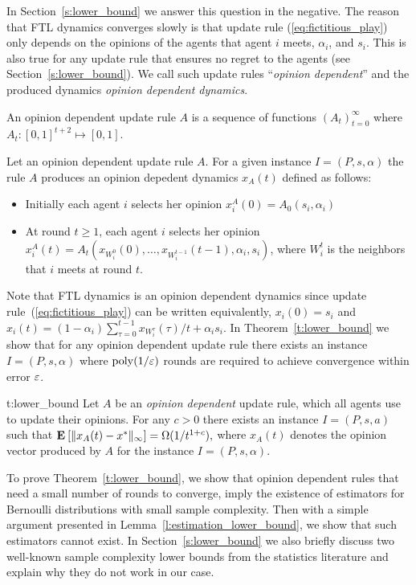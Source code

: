 In Section~\ref{s:lower_bound} we answer this question in the negative.
The reason that FTL dynamics converges slowly is that
update rule (\ref{eq:fictitious_play})
only depends on the opinions of the agents that agent $i$ meets,
$\alpha_i$, and $s_i$. This is also true for any update rule that
ensures no regret to the agents (see Section~\ref{s:lower_bound}).
We call such update rules \enquote{\emph{opinion dependent}}
and the produced dynamics \emph{opinion dependent dynamics}.

\begin{definition}\label{d:opinion_dependent_dynamics}
An opinion dependent update rule $A$ is a sequence of
functions $(A_t)_{t=0}^\infty$ where
$A_t: [0,1]^{t+2}\mapsto [0,1]$.
\end{definition}

\begin{definition}\label{d:opinion_dependent_dynamics}
Let an opinion dependent update rule $A$. For a given instance $I=(P,s,\alpha)$
the rule $A$ produces an opinion depedent dynamics $x_A(t)$ defined as follows:
\begin{itemize}
 \item Initially each agent $i$ selects her opinion $x_i^A(0)=A_0(s_i,\alpha_i)$
 \item At round $t\geq 1$, each agent $i$ selects her opinion
   \(x_i^A(t)=A_t(x_{W_i^0}(0),\dots,x_{W_i^{t-1}}(t-1),\alpha_i,s_i)\),
where $W_i^t$ is the neighbors that $i$ meets at round $t$.
\end{itemize}
\end{definition}

Note that FTL dynamics is an opinion dependent dynamics
since update rule~(\ref{eq:fictitious_play}) can
be written equivalently, $x_i(0)=s_i$ and $x_i(t)=(1-\alpha_i)\sum_{\tau=0}^{t-1}x_{W_i^\tau}(\tau)/t + \alpha_i s_i$.
In Theorem~\ref{t:lower_bound} we
show that for any opinion dependent update rule there exists an instance
$I = (P,s,\alpha)$ where $\mathrm{poly}(1/\varepsilon)$ rounds are required to
achieve convergence within error $\varepsilon$.
\begin{reptheorem}{t:lower_bound}
  Let $A$ be an \emph{opinion dependent} update rule, which all
  agents use to update their opinions.
  For any $c>0$ there exists an instance $I=(P,s,a)$ such that
  \(
    \Exp{\norm{\infty}{x_A(t) - x^*}} = \Omega(1/t^{1+c}),
  \)
  where $x_A(t)$ denotes the opinion vector produced by $A$
  for the instance $I=(P,s,\alpha)$.
\end{reptheorem}
%
To prove Theorem~\ref{t:lower_bound}, we show that opinion dependent rules
that need a small number of rounds to converge, imply the existence
of estimators for Bernoulli distributions with
small sample complexity. Then with a simple argument
presented in Lemma~\ref{l:estimation_lower_bound},
we show that such estimators cannot exist.
In Section~\ref{s:lower_bound} we also
briefly discuss two well-known sample complexity lower bounds
from the statistics literature and explain why they do not work in our case.

